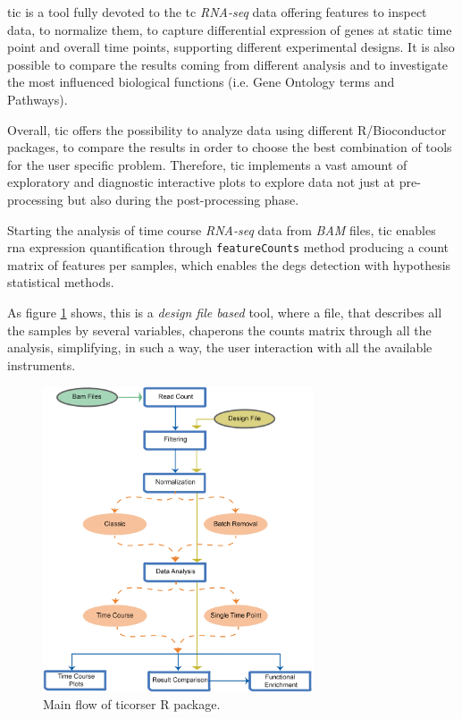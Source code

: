 \gls{tic} is a tool fully devoted to the \gls{tc} \textit{RNA-seq} data offering features to inspect data, to normalize them, to capture differential expression of genes at static time point and overall time points, supporting different experimental designs.
It is also possible to compare the results coming from different analysis and to investigate the most influenced biological functions (i.e. Gene Ontology \cite{GeneOntologyConsortium2004, GeneOntologyConsortium2015} terms and Pathways).

Overall, \gls{tic} offers the possibility to analyze data using different R/Bioconductor \cite{Gentleman2004} packages, to compare the results in order to choose the best combination of tools for the user specific problem. Therefore, \gls{tic} implements a vast amount of exploratory and diagnostic interactive plots to explore data not just at pre-processing but also during the post-processing phase. 


Starting the analysis of time course \textit{RNA-seq} data from \textit{BAM} files, \gls{tic} enables \gls{rna} expression quantification through \lstinline!featureCounts! method \cite{Liao2014} producing a count matrix of features per samples, which enables the \glspl{deg} detection with hypothesis statistical methods.

As figure \ref{fig:ticorserflow} shows, this is a \textit{design file based} tool, where a file, that describes all the samples by several variables, chaperons the counts matrix through all the analysis, simplifying, in such a way, the user interaction with all the available instruments.

\begin{figure}[H]
\centering
\includegraphics[width=8cm, keepaspectratio]{img/ticorser/main_flow.pdf}
\caption[ticorser mainflow]{Main flow of ticorser R package.}
\label{fig:ticorserflow}
\end{figure}
 
